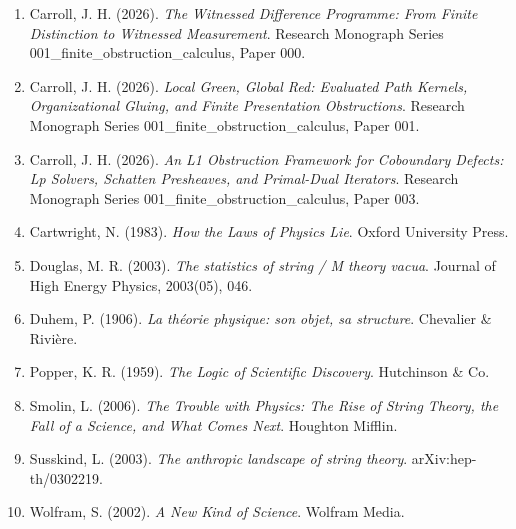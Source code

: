 \documentclass[
  10pt,
]{article}
\begin{document}
\begin{enumerate}
\def\labelenumi{\arabic{enumi}.}
\item
  Carroll, J. H. (2026). \emph{The Witnessed Difference Programme: From Finite Distinction to Witnessed Measurement}. Research Monograph Series 001\_finite\_obstruction\_calculus, Paper 000.
\item
  Carroll, J. H. (2026). \emph{Local Green, Global Red: Evaluated Path Kernels, Organizational Gluing, and Finite Presentation Obstructions}. Research Monograph Series 001\_finite\_obstruction\_calculus, Paper 001.
\item
  Carroll, J. H. (2026). \emph{An L1 Obstruction Framework for Coboundary Defects: Lp Solvers, Schatten Presheaves, and Primal-Dual Iterators}. Research Monograph Series 001\_finite\_obstruction\_calculus, Paper 003.
\item
  Cartwright, N. (1983). \emph{How the Laws of Physics Lie}. Oxford University Press.
\item
  Douglas, M. R. (2003). \emph{The statistics of string / M theory vacua}. Journal of High Energy Physics, 2003(05), 046.
\item
  Duhem, P. (1906). \emph{La théorie physique: son objet, sa structure}. Chevalier \& Rivière.
\item
  Popper, K. R. (1959). \emph{The Logic of Scientific Discovery}. Hutchinson \& Co.
\item
  Smolin, L. (2006). \emph{The Trouble with Physics: The Rise of String Theory, the Fall of a Science, and What Comes Next}. Houghton Mifflin.
\item
  Susskind, L. (2003). \emph{The anthropic landscape of string theory}. arXiv:hep-th/0302219.
\item
  Wolfram, S. (2002). \emph{A New Kind of Science}. Wolfram Media.
\end{enumerate}
\end{document}
